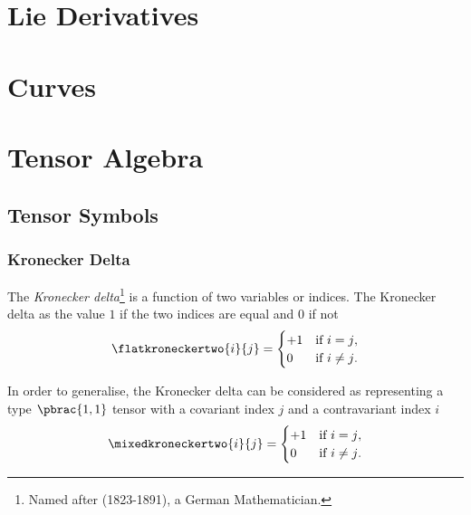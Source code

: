 \section{Lie Derivatives}


\section{Curves}


\section{Tensor Algebra}
\label{sec:TensorAlgebra}

\subsection{Tensor Symbols}
\label{subsec:TensorAlgebraSymbols}

\subsubsection{Kronecker Delta}
\label{subsubsec:TensorSymbolsKroneckerDelta}

The \emph{Kronecker delta}\footnote{Named
after (1823-1891), a German Mathematician.} is a function of two
variables or indices. The Kronecker delta as the value $1$ if the two
indices are equal and $0$ if not \ie
\begin{equation}
  \flatkroneckertwo{i}{j}=\begin{cases}
  +1&\text{if $i=j$}, \\
  0 &\text{if $i\neq j$.}
  \end{cases}
  \label{eqn:DefinitionKroneckerDelta}
\end{equation}

In order to generalise, the Kronecker delta can be considered as representing a type $\pbrac{1,1}$ tensor with a covariant index $j$ and a contravariant index $i$ \ie
\begin{equation}
  \mixedkroneckertwo{i}{j}=\begin{cases}
  +1&\text{if $i=j$}, \\
  0 &\text{if $i\neq j$.}
  \end{cases}
  \label{eqn:DefinitionGeneralisedKroneckerDeltaTwo}
\end{equation}

